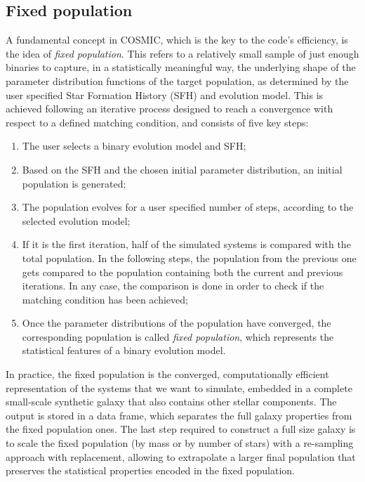 \subsection{Fixed population}
A fundamental concept in COSMIC, which is the key to the code's efficiency, is the idea of \textit{fixed population}.
This refers to a relatively small sample of just enough binaries to capture, in a statistically meaningful way, the underlying shape of the parameter distribution functions of the target population, as determined by the user specified Star Formation History (SFH) and evolution model.
This is achieved following an iterative process designed to reach a convergence with respect to a defined matching condition, and consists of five key steps:
\begin{enumerate}
    \item The user selects a binary evolution model and SFH;
    \item Based on the SFH and the chosen initial parameter distribution, an initial population is generated;
    \item The population evolves for a user specified number of steps, according to the selected evolution model;
    \item If it is the first iteration, half of the simulated systems is compared with the total population. In the following steps, the population from the previous one gets compared to the population containing both the current and previous iterations.
    In any case, the comparison is done in order to check if the matching condition has been achieved;
    \item Once the parameter distributions of the population have converged, the corresponding population is called \textit{fixed population}, which represents the statistical features of a binary evolution model.
\end{enumerate}
In practice, the fixed population is the converged, computationally efficient representation of the systems that we want to simulate, embedded in a complete small-scale synthetic galaxy that also contains other stellar components.
The output is stored in a data frame, which separates the full galaxy properties from the fixed population ones.
The last step required to construct a full size galaxy is to scale the fixed population (by mass or by number of stars) with a re-sampling approach with replacement, allowing to extrapolate a larger final population that preserves the statistical properties encoded in the fixed population.

